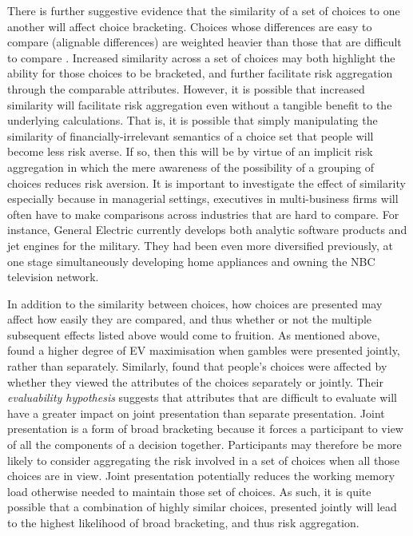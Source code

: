 \documentclass[a4paper, nobind, dvipsnames]{templates/ociamthesis}
\theoremstyle{definition}
\theoremstyle{definition}
\theoremstyle{definition}
\theoremstyle{definition}
\theoremstyle{remark}
\begin{document}
There is further suggestive evidence that the similarity of a set of choices to
one another will affect choice bracketing. Choices whose differences are easy to
compare (alignable differences) are weighted heavier than those that are
difficult to compare \autocite{markman1995,markman2010}. Increased similarity across a
set of choices may both highlight the ability for those choices to be bracketed,
and further facilitate risk aggregation through the comparable attributes.
However, it is possible that increased similarity will facilitate risk
aggregation even without a tangible benefit to the underlying calculations. That
is, it is possible that simply manipulating the similarity of
financially-irrelevant semantics of a choice set that people will become less
risk averse. If so, then this will be by virtue of an implicit risk aggregation
in which the mere awareness of the possibility of a grouping of choices reduces
risk aversion. It is important to investigate the effect of similarity
especially because in managerial settings, executives in multi-business firms
will often have to make comparisons across industries that are hard to compare.
For instance, General Electric currently develops both analytic software
products and jet engines for the military. They had been even more diversified
previously, at one stage simultaneously developing home appliances and owning
the NBC television network.

In addition to the similarity between choices, how choices are presented may
affect how easily they are compared, and thus whether or not the multiple
subsequent effects listed above would come to fruition. As mentioned above,
\textcite{haisley2008} found a higher degree of EV maximisation when gambles were
presented jointly, rather than separately. Similarly, \textcite{hsee1999} found that
people's choices were affected by whether they viewed the attributes of the
choices separately or jointly. Their \emph{evaluability hypothesis} suggests that
attributes that are difficult to evaluate will have a greater impact on joint
presentation than separate presentation. Joint presentation is a form of broad
bracketing because it forces a participant to view of all the components of a
decision together. Participants may therefore be more likely to consider
aggregating the risk involved in a set of choices when all those choices are in
view. Joint presentation potentially reduces the working memory load otherwise
needed to maintain those set of choices. As such, it is quite possible that a
combination of highly similar choices, presented jointly will lead to the
highest likelihood of broad bracketing, and thus risk aggregation.
\end{document}
